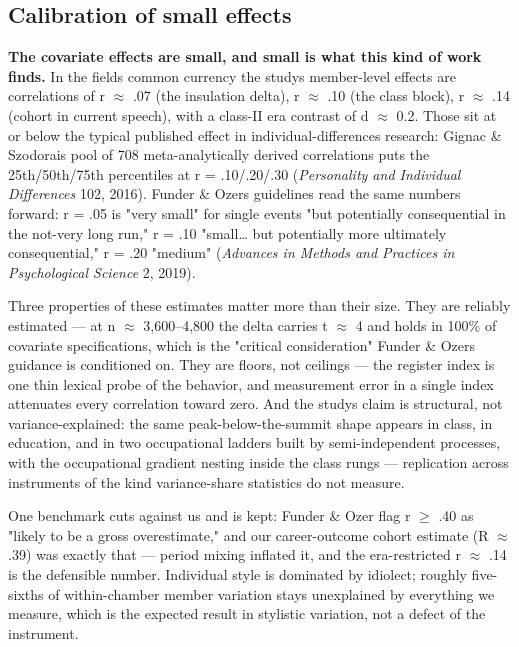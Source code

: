 \subsection{Calibration of small effects}\label{sub:calibration-small}

\textbf{The covariate effects are small, and small is what this kind of work
finds.} In the field\textquotesingle s common currency the study\textquotesingle s member-level effects
are correlations of r \(\approx\) .07 (the insulation delta), r \(\approx\) .10 (the class
block), r \(\approx\) .14 (cohort in current speech), with a class-II era contrast
of d \(\approx\) 0.2. Those sit at or below the typical published effect in
individual-differences research: Gignac \& Szodorai\textquotesingle s pool of 708
meta-analytically derived correlations puts the 25th/50th/75th percentiles
at r = .10/.20/.30 (\emph{Personality and Individual Differences} 102, 2016).
Funder \& Ozer\textquotesingle s guidelines read the same numbers forward: r = .05 is "very
small" for single events "but potentially consequential in the not-very
long run," r = .10 "small\ldots{} but potentially more ultimately consequential,"
r = .20 "medium" (\emph{Advances in Methods and Practices in Psychological
Science} 2, 2019).

Three properties of these estimates matter more than their size. They are
reliably estimated --- at n \(\approx\) 3,600--4,800 the delta carries t \(\approx\) 4 and holds
in 100\% of covariate specifications, which is the "critical
consideration" Funder \& Ozer\textquotesingle s guidance is conditioned on. They are
floors, not ceilings --- the register index is one thin lexical probe of
the behavior, and measurement error in a single index attenuates every
correlation toward zero. And the study\textquotesingle s claim is structural, not
variance-explained: the same peak-below-the-summit shape appears in
class, in education, and in two occupational ladders built by
semi-independent processes, with the occupational gradient nesting inside
the class rungs --- replication across instruments of the kind
variance-share statistics do not measure.

One benchmark cuts against us and is kept: Funder \& Ozer flag r \(\geq\) .40 as "likely to be a gross
overestimate," and our career-outcome cohort estimate (R \(\approx\) .39) was
exactly that --- period mixing inflated it, and the era-restricted r \(\approx\) .14
is the defensible number. Individual style is dominated by idiolect;
roughly five-sixths of within-chamber member variation stays unexplained
by everything we measure, which is the expected result in stylistic
variation, not a defect of the instrument.

